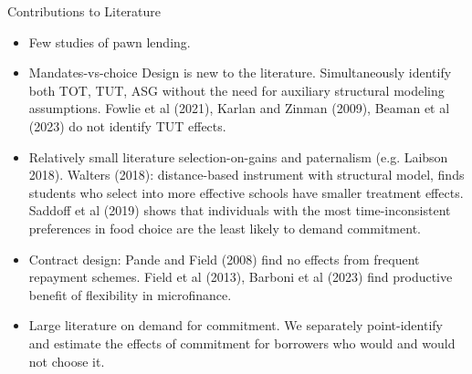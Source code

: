 \documentclass[9pt, aspectratio=169]{beamer}
\begin{document}
\begin{frame}{Contributions to Literature}

\begin{itemize}
    \item  Few studies of pawn lending.
    \vfill \item Mandates-vs-choice Design is new to the literature. Simultaneously identify both TOT, TUT, ASG without the need for auxiliary structural modeling assumptions. Fowlie et al (2021), Karlan and Zinman (2009), Beaman et al (2023) do not identify TUT effects. 
    \vfill \item Relatively small literature selection-on-gains and paternalism (e.g. Laibson 2018). Walters (2018): distance-based instrument with structural model, finds students who select into more effective schools have smaller treatment effects. Saddoff et al (2019) shows that individuals with the most time-inconsistent preferences in food choice are the least likely to demand commitment. 
    \vfill \item Contract design: Pande and Field (2008) find no effects from frequent repayment schemes. Field et al (2013), Barboni et al (2023) find productive benefit of flexibility in microfinance.
    \vfill \item Large literature on demand for commitment.  We separately point-identify and estimate the effects of commitment for borrowers who would and would not choose it. 
\end{itemize}
    
\end{frame}
\end{document}
